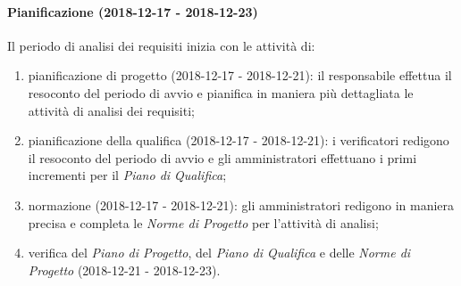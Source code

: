 		\paragraph{Pianificazione (2018-12-17 - 2018-12-23)\\} Il periodo di analisi dei requisiti inizia con le attività di:
			\begin{enumerate}[label = 2.1.\arabic*)]
				\item pianificazione di progetto (2018-12-17 - 2018-12-21): il responsabile effettua il resoconto del periodo di avvio e pianifica in maniera più dettagliata le attività di analisi dei requisiti; 
				\item pianificazione della qualifica (2018-12-17 - 2018-12-21): i verificatori redigono il resoconto del periodo di avvio e gli amministratori effettuano i primi incrementi per il \textit{Piano di Qualifica};
				\item normazione (2018-12-17 - 2018-12-21): gli amministratori redigono in maniera precisa e completa le \textit{Norme di Progetto} per l'attività di analisi;
				\item verifica del \textit{Piano di Progetto}, del \textit{Piano di Qualifica} e delle \textit{Norme di Progetto} (2018-12-21 - 2018-12-23).
			\end{enumerate}
